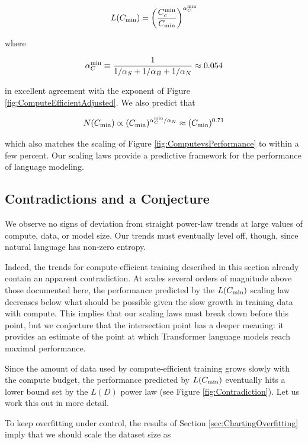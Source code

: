 \begin{equation}
L(C_{\rm min}) = \left( \frac{C_c^{\rm min}}{C_{\rm min}} \right)^{\alpha_C^{\rm min}}
\end{equation}

where

\begin{equation}
\alpha_C^{\rm min} \equiv \frac{1}{1/\alpha_S + 1/\alpha_B + 1/\alpha_N} \approx 0.054
\end{equation}

in excellent agreement with the exponent of Figure \ref{fig:ComputeEfficientAdjusted}.  We also predict that

\begin{equation}
N(C_{\rm min}) \propto (C_{\rm min})^{\alpha_C^{\rm min} / \alpha_N} \approx  (C_{\rm min})^{0.71}
\end{equation}

which also matches the scaling of Figure \ref{fig:ComputevsPerformance} to within a few percent.  Our scaling laws provide a predictive framework for the performance of language modeling.

\subsection{Contradictions and a Conjecture}

We observe no signs of deviation from straight power-law trends at large values of compute, data, or model size. Our trends must eventually level off, though, since natural language has non-zero entropy. 

Indeed, the trends for compute-efficient training described in this section already contain an apparent contradiction. At scales several orders of magnitude above those documented here, the performance predicted by the $L(C_{\rm min})$ scaling law decreases below what should be possible given the slow growth in training data with compute.  This implies that our scaling laws must break down before this point, but we conjecture that the intersection point has a deeper meaning: it provides an estimate of the point at which Transformer language models reach maximal performance.

Since the amount of data used by compute-efficient training grows  slowly with the compute budget, the performance predicted by $L(C_{\rm min})$ eventually hits a lower bound set by the $L(D)$ power law (see Figure \ref{fig:Contradiction}).  Let us work this out in more detail.

To keep overfitting under control, the results of Section \ref{sec:ChartingOverfitting} imply that we should scale the dataset size as

